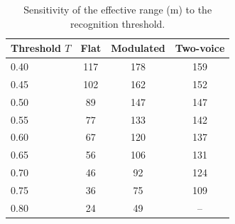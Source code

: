 \begin{table}[H]
\centering
\caption{Sensitivity of the effective range (m) to the recognition threshold.}
\label{tab:p2sens}
\small
\begin{tabular}{lccc}
\toprule
Threshold $T$ & Flat & Modulated & Two-voice \\
\midrule
0.40 & 117 & 178 & 159 \\
0.45 & 102 & 162 & 152 \\
0.50 & 89 & 147 & 147 \\
0.55 & 77 & 133 & 142 \\
0.60 & 67 & 120 & 137 \\
0.65 & 56 & 106 & 131 \\
0.70 & 46 & 92 & 124 \\
0.75 & 36 & 75 & 109 \\
0.80 & 24 & 49 & -- \\
\bottomrule
\end{tabular}
\end{table}